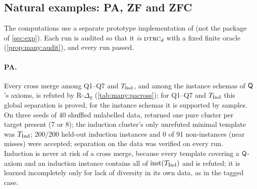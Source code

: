 \subsection{Natural examples: PA, ZF and ZFC}\label{sec:many:examples}

The computations use a separate prototype implementation of \DTRC{} (not the package of
\cref{sec:exp}). Each run is audited so that it \emph{is} $\textsc{dtrc}_d$ with a fixed finite oracle (\cref{prop:many:audit}),
and every run passed.

\paragraph{PA.} Every cross merge among Q1--Q7 and $T_{\mathrm{Ind}}$, and among the instance schemas of $\mathsf{Q}$'s axioms, is
refuted by R-$\Delta_0$ (\cref{tab:many:pacross}); for Q1--Q7 and $T_{\mathrm{Ind}}$ this global separation is proved, for the instance schemas it is supported by samples. On three seeds of 40
shuffled unlabelled data, \DTRC{} returned one pure cluster per target present (7 or 8); the induction cluster's only
unrefuted minimal template was $T_{\mathrm{Ind}}$; 200/200 held-out induction instances and 0 of 91 non-instances (near misses)
were accepted; separation on the data was verified on every run. Induction is never at risk of a cross merge, because every
template covering a $\mathsf{Q}$-axiom and an induction instance contains all of $\mathrm{inst}(T_{\mathrm{Ind}})$ and is refuted; it is learned
incompletely only for lack of diversity in its own data, as in the tagged case.

